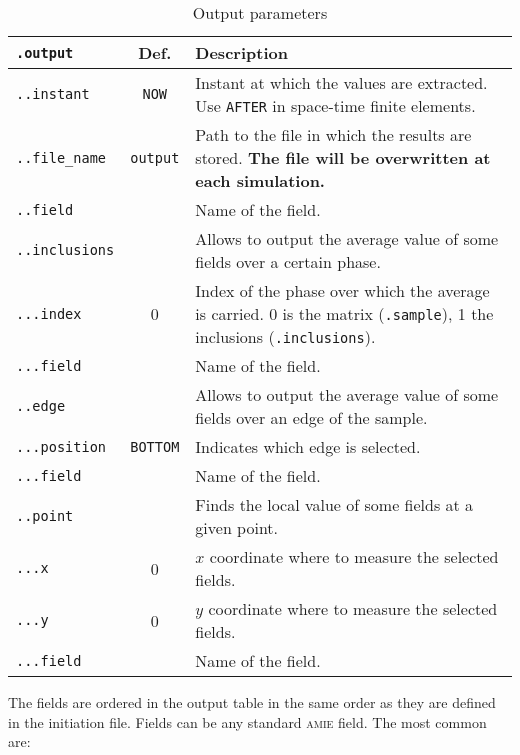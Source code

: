\documentclass[10pt]{article}
\newcommand{\amie}{\textsc{amie}\xspace}
\begin{document}
\begin{table}[h!]
\begin{tabularx}{\textwidth}{lcX}
\verb+.output+ & Def. & Description\\
\hline
\verb+..instant+ & \verb+NOW+  & Instant at which the values are extracted. Use \verb+AFTER+ in space-time finite elements.\\	
\verb+..file_name+ & \verb+output+ & Path to the file in which the results are stored. \textbf{The file will be overwritten at each simulation.}\\
\verb+..field+ & & Name of the field. \\
\verb+..inclusions+ & & Allows to output the average value of some fields over a certain phase. \\
\verb+...index+ & 0 & Index of the phase over which the average is carried. 0 is the matrix (\verb+.sample+), 1 the inclusions (\verb+.inclusions+).\\
\verb+...field+ & & Name of the field. \\
\verb+..edge+ & & Allows to output the average value of some fields over an edge of the sample. \\
\verb+...position+ & \verb+BOTTOM+ & Indicates which edge is selected.\\
\verb+...field+ & & Name of the field. \\
\verb+..point+ & & Finds the local value of some fields at a given point.\\
\verb+...x+ & 0 & $x$ coordinate where to measure the selected fields.\\
\verb+...y+ & 0 & $y$ coordinate where to measure the selected fields.\\
\verb+...field+ & & Name of the field. \\
\hline
\end{tabularx}
\caption{Output parameters}
\end{table}

The fields are ordered in the output table in the same order as they are defined in the initiation file. Fields can be any standard \amie field. The most common are:
\end{document}
